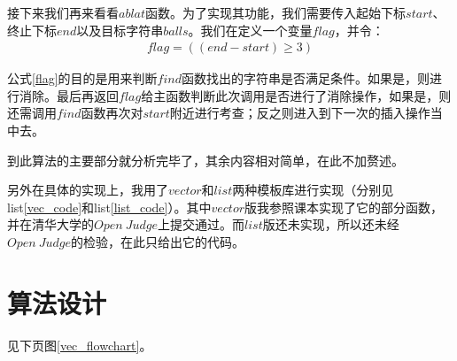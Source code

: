 \documentclass[UTF8]{ctexart}
\begin{document}
	\indent 接下来我们再来看看$ablat$函数。为了实现其功能，我们需要传入起始下标$start$、终止下标$end$以及目标字符串$balls$。我们在定义一个变量$flag$，并令：
	\begin{align}
	flag = ((end - start) \geq 3) \label{flag}
	\end{align}
	
	\indent 公式\ref{flag}的目的是用来判断$find$函数找出的字符串是否满足条件。如果是，则进行消除。最后再返回$flag$给主函数判断此次调用是否进行了消除操作，如果是，则还需调用$find$函数再次对$start$附近进行考查；反之则进入到下一次的插入操作当中去。
	
	\indent 到此算法的主要部分就分析完毕了，其余内容相对简单，在此不加赘述。
	
	\indent 另外在具体的实现上，我用了$vector$和$list$两种模板库进行实现（分别见list\ref{vec_code}和list\ref{list_code}）。其中$vector$版我参照课本\cite{data_structure}实现了它的部分函数，并在清华大学的$Open\ Judge$上提交通过。而$list$版还未实现，所以还未经$Open\ Judge$的检验，在此只给出它的代码。
	\section{算法设计}
	见下页图\ref{vec_flowchart}。
\end{document}
